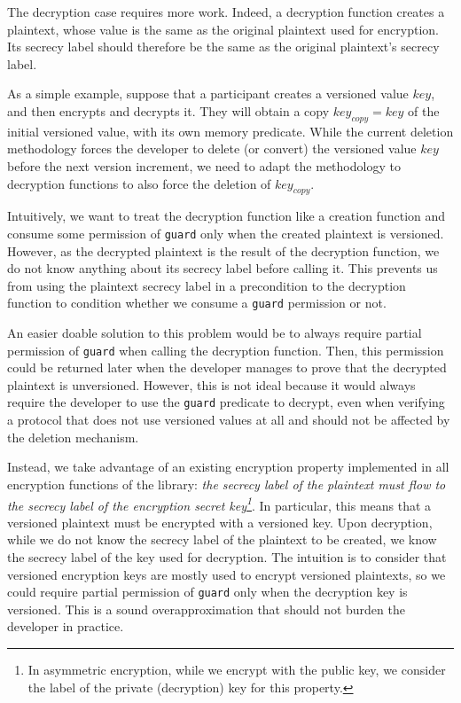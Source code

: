 The decryption case requires more work. 
Indeed, a decryption function creates a plaintext, whose value is the same as the original plaintext used for encryption. 
Its secrecy label should therefore be the same as the original plaintext's secrecy label.

As a simple example, suppose that a participant creates a versioned value $key$, and then encrypts and decrypts it.
They will obtain a copy $key_{copy}=key$ of the initial versioned value, with its own memory predicate.
While the current deletion methodology forces the developer to delete (or convert) the versioned value $key$ before the next version increment, we need to adapt the methodology to decryption functions to also force the deletion of $key_{copy}$.

Intuitively, we want to treat the decryption function like a creation function and consume some permission of \texttt{guard} only when the created plaintext is versioned.
However, as the decrypted plaintext is the result of the decryption function, we do not know anything about its secrecy label before calling it. This prevents us from using the plaintext secrecy label in a precondition to the decryption function to condition whether we consume a \texttt{guard} permission or not.

An easier doable solution to this problem would be to always require partial permission of \texttt{guard} when calling the decryption function.
Then, this permission could be returned later when the developer manages to prove that the decrypted plaintext is unversioned.
However, this is not ideal because it would always require the developer to use the \texttt{guard} predicate to decrypt, even when verifying a protocol that does not use versioned values at all and should not be affected by the deletion mechanism.

Instead, we take advantage of an existing encryption property implemented in all encryption functions of the library: \emph{the secrecy label of the plaintext must flow to the secrecy label of the encryption secret key\footnote{In asymmetric encryption, while we encrypt with the public key, we consider the label of the private (decryption) key for this property.}}.
In particular, this means that a versioned plaintext must be encrypted with a versioned key.
Upon decryption, while we do not know the secrecy label of the plaintext to be created, we know the secrecy label of the key used for decryption.
The intuition is to consider that versioned encryption keys are mostly used to encrypt versioned plaintexts, so we could require partial permission of \texttt{guard} only when the decryption key is versioned.
This is a sound overapproximation that should not burden the developer in practice.

